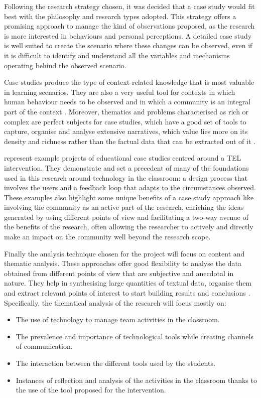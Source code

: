 Following the research strategy chosen, it was decided that a case study would fit best with the philosophy and research types adopted. This strategy offers a promising
approach to manage the kind of observations proposed, as the research is more interested in behaviours and personal perceptions. A detailed case study is well suited to
create the scenario where these changes can be observed, even if it is difficult to identify and understand all the variables and mechanisms operating behind the observed
scenario.

Case studies produce the type of context-related knowledge that is most valuable in learning scenarios. They are also a very useful tool for contexts in which human behaviour
needs to be observed and in which a community is an integral part of the context \parencite{hamilton_2013}. Moreover, thematics and problems characterised as rich or complex
are perfect subjects for case studies, which have a good set of tools to capture, organise and analyse extensive narratives, which value lies more on its density and richness
rather than the factual data that can be extracted out of it \parencite{seale_2007,grauer_2012}.

\textcite{cober_2015,tay_2017} represent example projects of educational case studies centred around a \ac{TEL} intervention. They demonstrate and set a precedent of many of the
foundations used in this research around technology in the classroom: a design process that involves the users and a feedback loop that adapts to the circumstances observed. These
examples also highlight some unique benefits of a case study approach like involving the community as an active part of the research, enriching the ideas generated by using different
points of view and facilitating a two-way avenue of the benefits of the research, often allowing the researcher to actively and directly make an impact on the community well beyond
the research scope.

Finally the analysis technique chosen for the project will focus on content and thematic analysis. These approaches offer good flexibility to analyse the data obtained from different
points of view that are subjective and anecdotal in nature. They help in synthesising large quantities of textual data, organise them and extract relevant points of interest to start
building results and conclusions \parencite{kiger_2020,neuendorf_2018}. Specifically, the thematical analysis of the research will focus mostly on:

\begin{itemize}
    \item The use of technology to manage team activities in the classroom.
    \item The prevalence and importance of technological tools while creating channels of communication.
    \item The interaction between the different tools used by the students.
    \item Instances of reflection and analysis of the activities in the classroom thanks to the use of the tool proposed for the intervention.
\end{itemize}

